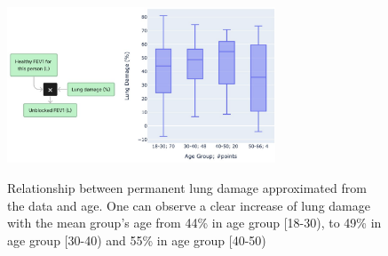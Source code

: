 \begin{figure}[!h]
    \caption{Relationship between permanent lung damage approximated from the data and age.  One can observe a clear increase of lung damage with the mean group's age from 44\% in age group [18-30), to 49\% in age group [30-40) and 55\% in age group [40-50)}
    \centering
    \includegraphics[width=80mm]{Chapter1/Figs/factor_healthy_fev1_lung_damage.png}
    \label{fig:factor_fev1_lung_damage}
\end{figure}

